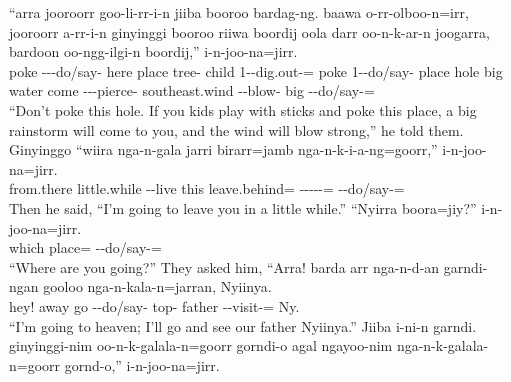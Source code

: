 \begin{exye}
\exy {}
\gll ``arra jooroorr goo-li-rr-i-n jiiba booroo bardag-ng. baawa o-rr-olboo-n=irr, jooroorr a-rr-i-n ginyinggi booroo riiwa boordij oola darr oo-n-k-ar-n joogarra, bardoon oo-ngg-ilgi-n boordij,'' i-n-joo-na=jirr.\\
 poke ---do/say- here place tree- child 1--dig.out-= poke 1--do/say-  place hole big water come ---pierce-  southeast.wind --blow- big --do/say-=\\
\ft ``Don't poke this hole. If you kids play with sticks and poke this place, a big rainstorm will come to you, and the wind will blow strong,'' he told them.
\exy {}
\gll Ginyinggo ``wiira nga-n-gala jarri birarr=jamb nga-n-k-i-a-ng=goorr,'' i-n-joo-na=jirr.\\
from.there little.while --live this leave.behind= -----= --do/say-=\\
\ft Then he said, ``I'm going to leave you in a little while.''
\newpage\exy {}
\gll ``Nyirra boora=jiy?'' i-n-joo-na=jirr.\\
which place= --do/say-=\\
\ft ``Where are you going?'' They asked him,
\exy {}
\gll ``Arra! barda arr nga-n-d-an garndi-ngan gooloo nga-n-kala-n=jarran, Nyiinya.\\
hey! away go --do/say- top- father --visit-= Ny.\\
\ft ``I'm going to heaven; I'll go and see our father Nyiinya.''
\exy {}
\gll Jiiba i-ni-n garndi. ginyinggi-nim oo-n-k-galala-n=goorr gorndi-o agal ngayoo-nim nga-n-k-galala-n=goorr gornd-o,'' i-n-joo-na=jirr.\\

\end{exye}
